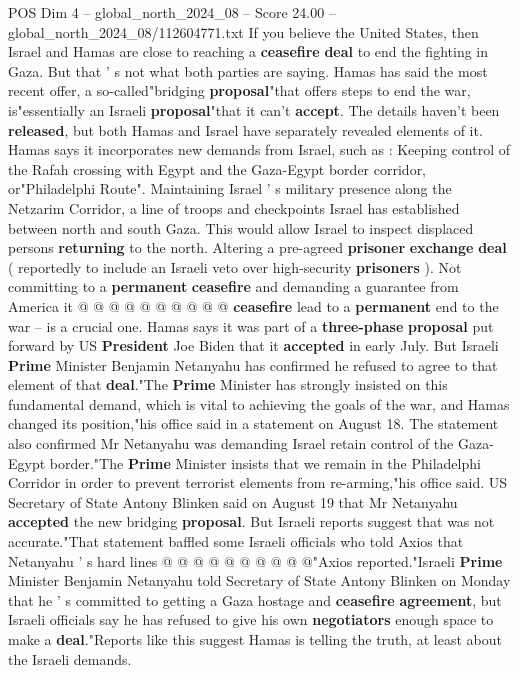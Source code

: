 \begin{textsample}{POS Dim 4 – global\_north\_2024\_08 – Score 24.00 – global\_north\_2024\_08/112604771.txt}  \label{ex:f4_pos_156}
If you believe the United States, then Israel and Hamas are close to reaching a \textbf{ceasefire} \textbf{deal} to end the fighting in Gaza.
But that ' s not what both parties are saying.
Hamas has said the most recent offer, a so-called"bridging \textbf{proposal}"that offers steps to end the war, is"essentially an Israeli \textbf{proposal}"that it can't \textbf{accept}.
The details haven't been \textbf{released}, but both Hamas and Israel have separately revealed elements of it.
Hamas says it incorporates new demands from Israel, such as : Keeping control of the Rafah crossing with Egypt and the Gaza-Egypt border corridor, or"Philadelphi Route".
Maintaining Israel ' s military presence along the Netzarim Corridor, a line of troops and checkpoints Israel has established between north and south Gaza.
This would allow Israel to inspect displaced persons \textbf{returning} to the north.
Altering a pre-agreed \textbf{prisoner} \textbf{exchange} \textbf{deal} ( reportedly to include an Israeli veto over high-security \textbf{prisoners} ).
Not committing to a \textbf{permanent} \textbf{ceasefire} and demanding a guarantee from America it @ @ @ @ @ @ @ @ @ @ \textbf{ceasefire} lead to a \textbf{permanent} end to the war -- is a crucial one.
Hamas says it was part of a \textbf{three-phase} \textbf{proposal} put forward by US \textbf{President} Joe Biden that it \textbf{accepted} in early July.
But Israeli \textbf{Prime} Minister Benjamin Netanyahu has confirmed he refused to agree to that element of that \textbf{deal}."The \textbf{Prime} Minister has strongly insisted on this fundamental demand, which is vital to achieving the goals of the war, and Hamas changed its position,"his office said in a statement on August 18.
The statement also confirmed Mr Netanyahu was demanding Israel retain control of the Gaza-Egypt border."The \textbf{Prime} Minister insists that we remain in the Philadelphi Corridor in order to prevent terrorist elements from re-arming,"his office said.
US Secretary of State Antony Blinken said on August 19 that Mr Netanyahu \textbf{accepted} the new bridging \textbf{proposal}.
But Israeli reports suggest that was not accurate."That statement baffled some Israeli officials who told Axios that Netanyahu ' s hard lines @ @ @ @ @ @ @ @ @ @"Axios reported."Israeli \textbf{Prime} Minister Benjamin Netanyahu told Secretary of State Antony Blinken on Monday that he ' s committed to getting a Gaza hostage and \textbf{ceasefire} \textbf{agreement}, but Israeli officials say he has refused to give his own \textbf{negotiators} enough space to make a \textbf{deal}."Reports like this suggest Hamas is telling the truth, at least about the Israeli demands.

\end{textsample}
